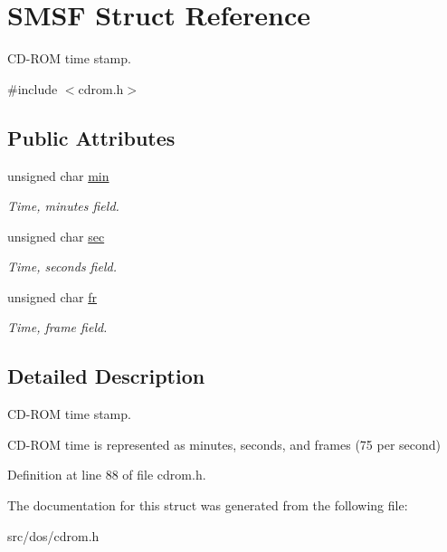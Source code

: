 \hypertarget{structSMSF}{\section{S\-M\-S\-F Struct Reference}
\label{structSMSF}
}


C\-D-\/\-R\-O\-M time stamp.  




{\ttfamily \#include $<$cdrom.\-h$>$}

\subsection*{Public Attributes}
\begin{DoxyCompactItemize}
\item 
\hypertarget{structSMSF_a255d0543dd1a6ed1ef98d1554a305b1c}{unsigned char \hyperlink{structSMSF_a255d0543dd1a6ed1ef98d1554a305b1c}{min}}\label{structSMSF_a255d0543dd1a6ed1ef98d1554a305b1c}

\begin{DoxyCompactList}\small\item\em Time, minutes field. \end{DoxyCompactList}\item 
\hypertarget{structSMSF_a03726b294328a234ca219fdcdcf59b41}{unsigned char \hyperlink{structSMSF_a03726b294328a234ca219fdcdcf59b41}{sec}}\label{structSMSF_a03726b294328a234ca219fdcdcf59b41}

\begin{DoxyCompactList}\small\item\em Time, seconds field. \end{DoxyCompactList}\item 
\hypertarget{structSMSF_a7e7a172427d5827e25ed35c3f62a2ce5}{unsigned char \hyperlink{structSMSF_a7e7a172427d5827e25ed35c3f62a2ce5}{fr}}\label{structSMSF_a7e7a172427d5827e25ed35c3f62a2ce5}

\begin{DoxyCompactList}\small\item\em Time, frame field. \end{DoxyCompactList}\end{DoxyCompactItemize}


\subsection{Detailed Description}
C\-D-\/\-R\-O\-M time stamp. 

C\-D-\/\-R\-O\-M time is represented as minutes, seconds, and frames (75 per second) 

Definition at line 88 of file cdrom.\-h.



The documentation for this struct was generated from the following file\-:\begin{DoxyCompactItemize}
\item 
src/dos/cdrom.\-h\end{DoxyCompactItemize}
